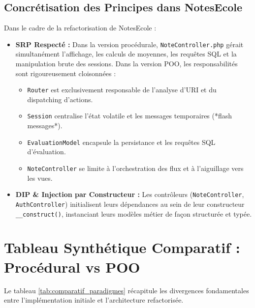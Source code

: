 \documentclass[11pt,a4paper,oneside]{report}
\begin{document}
\subsection{Concrétisation des Principes dans NotesEcole}
Dans le cadre de la refactorisation de NotesEcole :
\begin{itemize}[label=\textcolor{primaryMed}{\textbullet}]
    \item \textbf{SRP Respecté :} Dans la version procédurale, \texttt{NoteController.php} gérait simultanément l'affichage, les calculs de moyennes, les requêtes SQL et la manipulation brute des sessions. Dans la version POO, les responsabilités sont rigoureusement cloisonnées :
    \begin{itemize}
        \item \texttt{Router} est exclusivement responsable de l'analyse d'URI et du dispatching d'actions.
        \item \texttt{Session} centralise l'état volatile et les messages temporaires (*flash messages*).
        \item \texttt{EvaluationModel} encapsule la persistance et les requêtes SQL d'évaluation.
        \item \texttt{NoteController} se limite à l'orchestration des flux et à l'aiguillage vers les vues.
    \end{itemize}
    \item \textbf{DIP \& Injection par Constructeur :} Les contrôleurs (\texttt{NoteController}, \texttt{AuthController}) initialisent leurs dépendances au sein de leur constructeur \texttt{\_\_construct()}, instanciant leurs modèles métier de façon structurée et typée.
\end{itemize}

\section{Tableau Synthétique Comparatif : Procédural vs POO}

Le tableau \ref{tab:comparatif_paradigmes} récapitule les divergences fondamentales entre l'implémentation initiale et l'architecture refactorisée.
\end{document}

